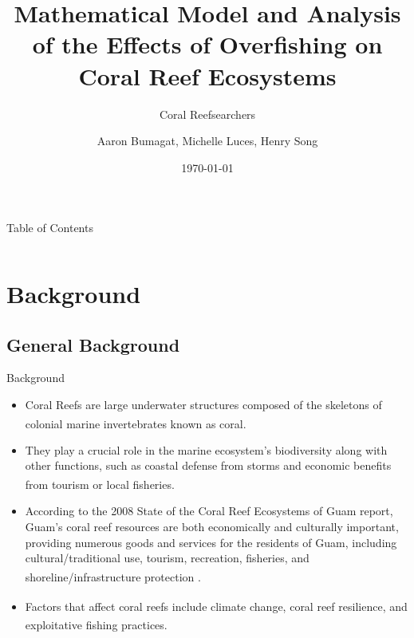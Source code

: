 \documentclass{beamer}
\title[]{Mathematical Model and Analysis of the Effects of Overfishing on Coral Reef Ecosystems}
\subtitle{Coral Reefsearchers}
\author{Aaron Bumagat, Michelle Luces, Henry Song }
\institute{University of Guam}
\date{\today}
\begin{document}
\frame{\titlepage}

\AtBeginSection[]{
    \begin{frame}{}
        \frametitle{}
        \setcounter{tocdepth}{2}
        \tableofcontents[currentsection, sections = \thesection]
        \setcounter{tocdepth}{1}
    \end{frame}
}

\begin{frame}{Table of Contents}
    \begin{columns}
        \begin{column}{0.5\textwidth}
            \tableofcontents[sections=1-2]
        \end{column}
        \begin{column}{0.5\textwidth}
            \tableofcontents[sections=3-4]
        \end{column}
    \end{columns}
\end{frame}


\section{Background}
\subsection{General Background}
\begin{frame}{Background}
    \begin{itemize}
        \item<1-> Coral Reefs are large underwater structures composed of the skeletons of colonial marine invertebrates known as coral\textsuperscript{\cite{ross}}.
         \item<2-> They play a crucial role in the marine ecosystem's biodiversity along with other functions, such as coastal defense from storms and economic benefits from tourism or local fisheries\textsuperscript{\cite{04_mathanalysis}}.
         \item<3-> According to the 2008 State of the Coral Reef Ecosystems of Guam report, Guam’s coral reef resources are both economically and culturally important, providing numerous goods and services for the residents of Guam, including cultural/traditional use, tourism, recreation, fisheries, and shoreline/infrastructure protection \textsuperscript{\cite{guamwebsite}}.
         \item<4-> Factors that affect coral reefs include climate change, coral reef resilience\textsuperscript{\cite{02_Riegl_Purkis_Model}}, and exploitative fishing practices\textsuperscript{\cite{05_quintero_machuca_cotto_bradley_ríos-soto_2016}}.
    \end{itemize}
\end{frame}
\end{document}
